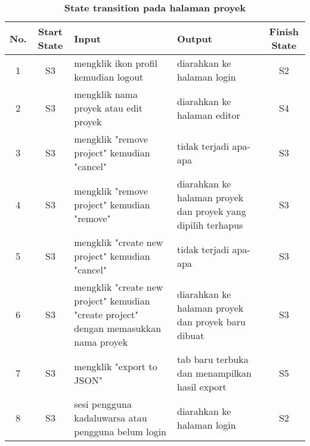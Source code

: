 \begin{table}
  \caption{\textbf{State transition pada halaman proyek}}
  \label{table:project-page}
  \centering
  \begin{tabular}{|c | c | m{45mm} | m{45mm} | c |}
    \hline
    \textbf{No.} & \textbf{Start State} & \textbf{Input} & \textbf{Output} & \textbf{Finish State} \\ [0.5ex]
    \hline
    1 & S3 & mengklik ikon profil kemudian logout & diarahkan ke halaman login & S2 \\
    2 & S3 & mengklik nama proyek atau edit proyek & diarahkan ke halaman editor & S4 \\
    3 & S3 & mengklik "remove project" kemudian "cancel" & tidak terjadi apa-apa & S3 \\
    4 & S3 & mengklik "remove project" kemudian "remove" & diarahkan ke halaman proyek dan proyek yang dipilih terhapus & S3 \\
    5 & S3 & mengklik "create new project" kemudian "cancel" & tidak terjadi apa-apa & S3 \\
    6 & S3 & mengklik "create new project" kemudian "create project" dengan memasukkan nama proyek & diarahkan ke halaman proyek dan proyek baru dibuat & S3 \\
    7 & S3 & mengklik "export to JSON" & tab baru terbuka dan menampilkan hasil export & S5 \\
    8 & S3 & sesi pengguna kadaluwarsa atau pengguna belum login & diarahkan ke halaman login & S2 \\ [1ex]
    \hline
  \end{tabular}
\end{table}

